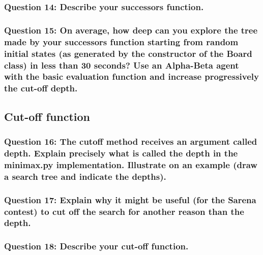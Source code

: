 \documentclass[a4paper,10pt]{article}
\begin{document}
				\subsubsection{Question 14: Describe your successors function.}
				\subsubsection{Question 15: On average, how deep can you explore the tree made by your successors function starting from random initial states (as generated by the constructor of the Board class) in less than 30 seconds? Use an Alpha-Beta agent with the basic evaluation function and increase progressively the cut-off depth.}
				
			\subsection{Cut-off function}
				\subsubsection{Question 16: The cutoff method receives an argument called depth. Explain precisely what is called the depth in the minimax.py implementation. Illustrate on an example (draw a search tree and indicate the depths).}
				\subsubsection{Question 17: Explain why it might be useful (for the Sarena contest) to cut off the search for another reason than the depth.}
				\subsubsection{Question 18: Describe your cut-off function.}
\end{document}

